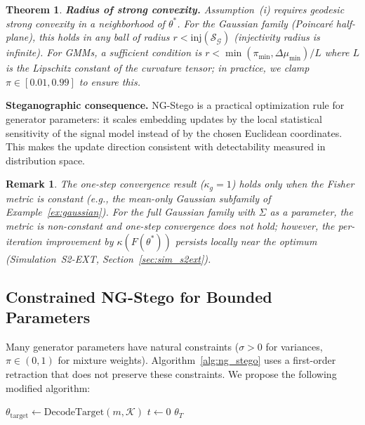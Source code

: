 \documentclass[a4paper,fleqn]{cas-dc}
\newtheorem{theorem}{Theorem}
\newtheorem{remark}{Remark}
\newcommand{\calS}{\mathcal{S}}
\newcommand{\calG}{\mathcal{G}}
\begin{document}
\begin{theorem}
  \textbf{Radius of strong convexity.}
  Assumption~(i) requires geodesic strong convexity in a neighborhood
  of $\theta^*$.  For the Gaussian family (Poincar\'{e} half-plane),
  this holds in any ball of radius $r < \mathrm{inj}(\calS_{\calG})$
  (injectivity radius is infinite).  For GMMs, a sufficient condition
  is $r < \min(\pi_{\min}, \Delta\mu_{\min}) / L$ where $L$ is the
  Lipschitz constant of the curvature tensor; in practice, we clamp
  $\pi \in [0.01, 0.99]$ to ensure this.
\end{theorem}

\noindent\textbf{Steganographic consequence.}
NG-Stego is a practical optimization rule for generator parameters: it scales
embedding updates by the local statistical sensitivity of the signal model
instead of by the chosen Euclidean coordinates. This makes the update direction
consistent with detectability measured in distribution space.

\begin{remark}%
  The one-step convergence result ($\kappa_g=1$) holds \emph{only} when
  the Fisher metric is constant (e.g., the mean-only Gaussian subfamily
  of Example~\ref{ex:gaussian}).  For the full Gaussian family with
  $\Sigma$ as a parameter, the metric is non-constant and one-step
  convergence does \emph{not} hold; however, the per-iteration
  improvement by $\kappa(F(\theta^*))$ persists locally near the
  optimum (Simulation~S2-EXT, Section~\ref{sec:sim_s2ext}).
\end{remark}

\subsection{Constrained NG-Stego for Bounded Parameters}

Many generator parameters have natural constraints ($\sigma > 0$ for
variances, $\pi \in (0,1)$ for mixture weights).  Algorithm~\ref{alg:ng_stego}
uses a first-order retraction that does not preserve these constraints.
We propose the following modified algorithm:

\begin{algorithm}[t]
\caption{Constrained NG-Stego}
\label{alg:ng_stego_constrained}
$\theta_{\mathrm{target}} \leftarrow \mathrm{DecodeTarget}(m,\mathcal{K})$\;
$t \leftarrow 0$\;
\Return $\theta_T$\;
\end{algorithm}
\end{document}
